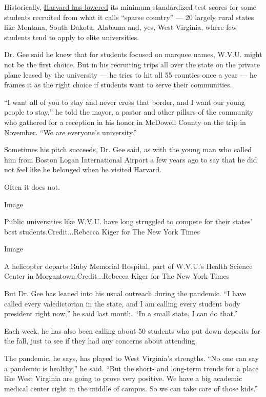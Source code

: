 Historically,
\href{https://www.nytimes.com/2018/10/15/us/harvard-affirmative-action-trial-asian-americans.html}{Harvard
has lowered} its minimum standardized test scores for some students
recruited from what it calls ``sparse country'' --- 20 largely rural
states like Montana, South Dakota, Alabama and, yes, West Virginia,
where few students tend to apply to elite universities.

Dr. Gee said he knew that for students focused on marquee names, W.V.U.
might not be the first choice. But in his recruiting trips all over the
state on the private plane leased by the university --- he tries to hit
all 55 counties once a year --- he frames it as the right choice if
students want to serve their communities.

``I want all of you to stay and never cross that border, and I want our
young people to stay,'' he told the mayor, a pastor and other pillars of
the community who gathered for a reception in his honor in McDowell
County on the trip in November. ``We are everyone's university.''

Sometimes his pitch succeeds, Dr. Gee said, as with the young man who
called him from Boston Logan International Airport a few years ago to
say that he did not feel like he belonged when he visited Harvard.

Often it does not.

Image

Public universities like W.V.U. have long struggled to compete for their
states' best students.Credit...Rebecca Kiger for The New York Times

Image

A helicopter departs Ruby Memorial Hospital, part of W.V.U.'s Health
Science Center in Morgantown.Credit...Rebecca Kiger for The New York
Times

But Dr. Gee has leaned into his usual outreach during the pandemic. ``I
have called every valedictorian in the state, and I am calling every
student body president right now,'' he said last month. ``In a small
state, I can do that.''

Each week, he has also been calling about 50 students who put down
deposits for the fall, just to see if they had any concerns about
attending.

The pandemic, he says, has played to West Virginia's strengths. ``No one
can say a pandemic is healthy,'' he said. ``But the short- and long-term
trends for a place like West Virginia are going to prove very positive.
We have a big academic medical center right in the middle of campus. So
we can take care of those kids.''

